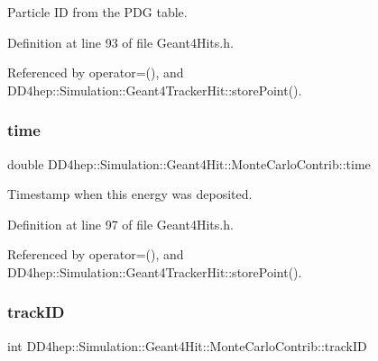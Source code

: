 Particle ID from the P\+DG table. 



Definition at line 93 of file Geant4\+Hits.\+h.



Referenced by operator=(), and D\+D4hep\+::\+Simulation\+::\+Geant4\+Tracker\+Hit\+::store\+Point().

\hypertarget{struct_d_d4hep_1_1_simulation_1_1_geant4_hit_1_1_monte_carlo_contrib_aa843f5069ad2f9e03d085bda49e9b658}{}\label{struct_d_d4hep_1_1_simulation_1_1_geant4_hit_1_1_monte_carlo_contrib_aa843f5069ad2f9e03d085bda49e9b658} 
\subsubsection{\texorpdfstring{time}{time}}
{\footnotesize\ttfamily double D\+D4hep\+::\+Simulation\+::\+Geant4\+Hit\+::\+Monte\+Carlo\+Contrib\+::time}



Timestamp when this energy was deposited. 



Definition at line 97 of file Geant4\+Hits.\+h.



Referenced by operator=(), and D\+D4hep\+::\+Simulation\+::\+Geant4\+Tracker\+Hit\+::store\+Point().

\hypertarget{struct_d_d4hep_1_1_simulation_1_1_geant4_hit_1_1_monte_carlo_contrib_a9dff0f94a376999512fc5d80ac2e2309}{}\label{struct_d_d4hep_1_1_simulation_1_1_geant4_hit_1_1_monte_carlo_contrib_a9dff0f94a376999512fc5d80ac2e2309} 
\subsubsection{\texorpdfstring{track\+ID}{trackID}}
{\footnotesize\ttfamily int D\+D4hep\+::\+Simulation\+::\+Geant4\+Hit\+::\+Monte\+Carlo\+Contrib\+::track\+ID}



